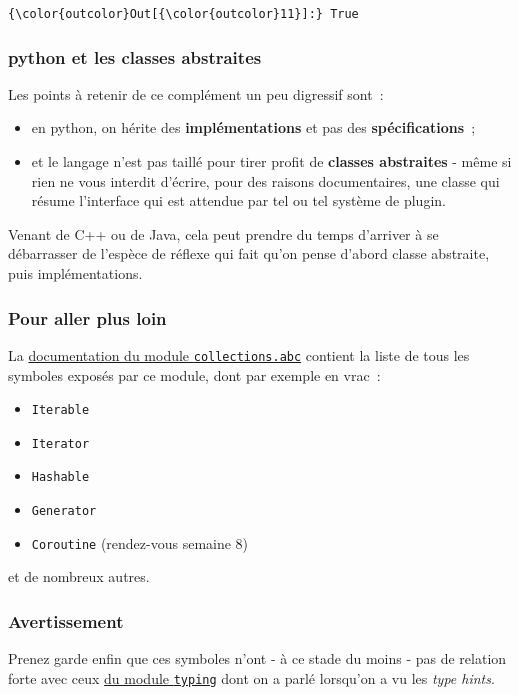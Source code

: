 \begin{Verbatim}[commandchars=\\\{\}]
{\color{outcolor}Out[{\color{outcolor}11}]:} True
\end{Verbatim}
            
    \hypertarget{python-et-les-classes-abstraites}{%
\subsubsection{python et les classes
abstraites}\label{python-et-les-classes-abstraites}}

    Les points à retenir de ce complément un peu digressif sont~:

\begin{itemize}
\tightlist
\item
  en python, on hérite des \textbf{implémentations} et pas des
  \textbf{spécifications}~;
\item
  et le langage n'est pas taillé pour tirer profit de \textbf{classes
  abstraites} - même si rien ne vous interdit d'écrire, pour des raisons
  documentaires, une classe qui résume l'interface qui est attendue par
  tel ou tel système de plugin.
\end{itemize}

    Venant de C++ ou de Java, cela peut prendre du temps d'arriver à se
débarrasser de l'espèce de réflexe qui fait qu'on pense d'abord classe
abstraite, puis implémentations.

    \hypertarget{pour-aller-plus-loin}{%
\subsubsection{Pour aller plus loin}\label{pour-aller-plus-loin}}

    La
\href{https://docs.python.org/3/library/collections.abc.html}{documentation
du module \texttt{collections.abc}} contient la liste de tous les
symboles exposés par ce module, dont par exemple en vrac~:

\begin{itemize}
\tightlist
\item
  \texttt{Iterable}
\item
  \texttt{Iterator}
\item
  \texttt{Hashable}
\item
  \texttt{Generator}
\item
  \texttt{Coroutine} (rendez-vous semaine 8)
\end{itemize}

et de nombreux autres.

    \hypertarget{avertissement}{%
\subsubsection{Avertissement}\label{avertissement}}

    Prenez garde enfin que ces symboles n'ont - à ce stade du moins - pas de
relation forte avec ceux
\href{https://docs.python.org/3/library/typing.html}{du module
\texttt{typing}} dont on a parlé lorsqu'on a vu les \emph{type hints}.


    
    
    
